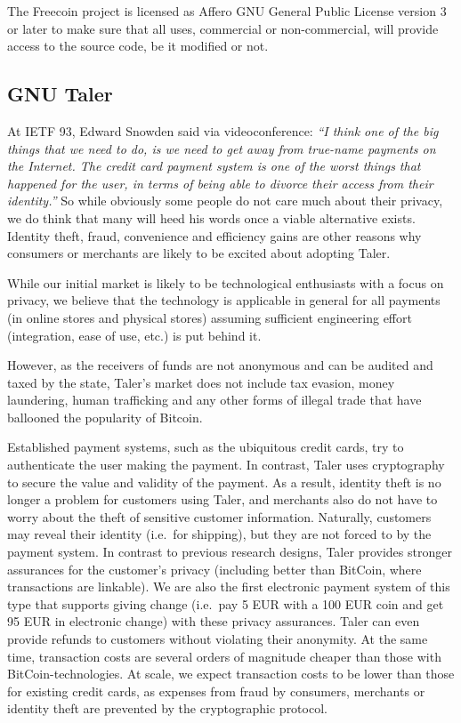 The Freecoin project is licensed as Affero GNU General Public License
version 3 or later to make sure that all uses, commercial or
non-commercial, will provide access to the source code, be it modified
or not.

\subsection{GNU Taler}\label{gnu-taler}

At IETF 93, Edward Snowden said via videoconference: \emph{``I think one
of the big things that we need to do, is we need to get away from
true-name payments on the Internet. The credit card payment system is
one of the worst things that happened for the user, in terms of being
able to divorce their access from their identity.''} So while obviously
some people do not care much about their privacy, we do think that many
will heed his words once a viable alternative exists. Identity theft,
fraud, convenience and efficiency gains are other reasons why consumers
or merchants are likely to be excited about adopting Taler.

While our initial market is likely to be technological enthusiasts with
a focus on privacy, we believe that the technology is applicable in
general for all payments (in online stores and physical stores) assuming
sufficient engineering effort (integration, ease of use, etc.) is put
behind it.

However, as the receivers of funds are not anonymous and can be audited
and taxed by the state, Taler's market does not include tax evasion,
money laundering, human trafficking and any other forms of illegal trade
that have ballooned the popularity of Bitcoin.

Established payment systems, such as the ubiquitous credit cards, try to
authenticate the user making the payment. In contrast, Taler uses
cryptography to secure the value and validity of the payment. As a
result, identity theft is no longer a problem for customers using Taler,
and merchants also do not have to worry about the theft of sensitive
customer information. Naturally, customers may reveal their identity
(i.e.~for shipping), but they are not forced to by the payment system.
In contrast to previous research designs, Taler provides stronger
assurances for the customer's privacy (including better than BitCoin,
where transactions are linkable). We are also the first electronic
payment system of this type that supports giving change (i.e.~pay 5 EUR
with a 100 EUR coin and get 95 EUR in electronic change) with these
privacy assurances. Taler can even provide refunds to customers without
violating their anonymity. At the same time, transaction costs are
several orders of magnitude cheaper than those with
BitCoin-technologies. At scale, we expect transaction costs to be lower
than those for existing credit cards, as expenses from fraud by
consumers, merchants or identity theft are prevented by the
cryptographic protocol.

